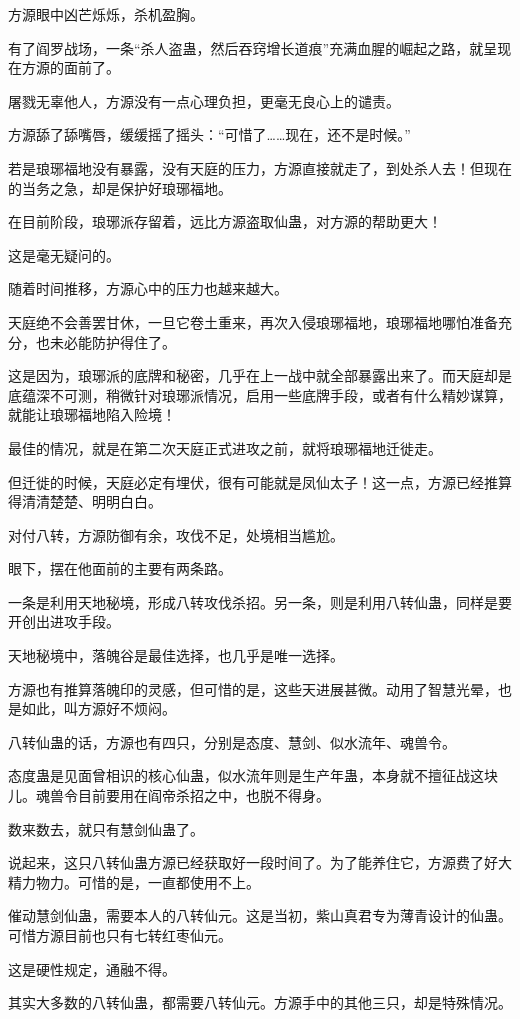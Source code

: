 \begin{this_body}
方源眼中凶芒烁烁，杀机盈胸。

有了阎罗战场，一条“杀人盗蛊，然后吞窍增长道痕”充满血腥的崛起之路，就呈现在方源的面前了。

屠戮无辜他人，方源没有一点心理负担，更毫无良心上的谴责。

方源舔了舔嘴唇，缓缓摇了摇头：“可惜了……现在，还不是时候。”

若是琅琊福地没有暴露，没有天庭的压力，方源直接就走了，到处杀人去！但现在的当务之急，却是保护好琅琊福地。

在目前阶段，琅琊派存留着，远比方源盗取仙蛊，对方源的帮助更大！

这是毫无疑问的。

随着时间推移，方源心中的压力也越来越大。

天庭绝不会善罢甘休，一旦它卷土重来，再次入侵琅琊福地，琅琊福地哪怕准备充分，也未必能防护得住了。

这是因为，琅琊派的底牌和秘密，几乎在上一战中就全部暴露出来了。而天庭却是底蕴深不可测，稍微针对琅琊派情况，启用一些底牌手段，或者有什么精妙谋算，就能让琅琊福地陷入险境！

最佳的情况，就是在第二次天庭正式进攻之前，就将琅琊福地迁徙走。

但迁徙的时候，天庭必定有埋伏，很有可能就是凤仙太子！这一点，方源已经推算得清清楚楚、明明白白。

对付八转，方源防御有余，攻伐不足，处境相当尴尬。

眼下，摆在他面前的主要有两条路。

一条是利用天地秘境，形成八转攻伐杀招。另一条，则是利用八转仙蛊，同样是要开创出进攻手段。

天地秘境中，落魄谷是最佳选择，也几乎是唯一选择。

方源也有推算落魄印的灵感，但可惜的是，这些天进展甚微。动用了智慧光晕，也是如此，叫方源好不烦闷。

八转仙蛊的话，方源也有四只，分别是态度、慧剑、似水流年、魂兽令。

态度蛊是见面曾相识的核心仙蛊，似水流年则是生产年蛊，本身就不擅征战这块儿。魂兽令目前要用在阎帝杀招之中，也脱不得身。

数来数去，就只有慧剑仙蛊了。

说起来，这只八转仙蛊方源已经获取好一段时间了。为了能养住它，方源费了好大精力物力。可惜的是，一直都使用不上。

催动慧剑仙蛊，需要本人的八转仙元。这是当初，紫山真君专为薄青设计的仙蛊。可惜方源目前也只有七转红枣仙元。

这是硬性规定，通融不得。

其实大多数的八转仙蛊，都需要八转仙元。方源手中的其他三只，却是特殊情况。


\end{this_body}
